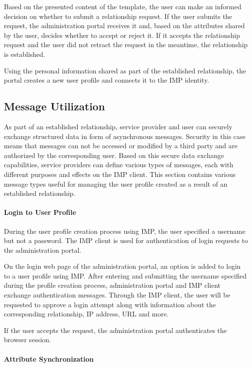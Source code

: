 Based on the presented content of the template, the user can make an informed decision on whether to submit a relationship request. If the user submits the request, the administration portal receives it and, based on the attributes shared by the user, decides whether to accept or reject it. If it accepts the relationship request and the user did not retract the request in the meantime, the relationship is established.

Using the personal information shared as part of the established relationship, the portal creates a new user profile and connects it to the IMP identity.

\subsection{Message Utilization}
As part of an established relationship, service provider and user can securely exchange structured data in form of asynchronous messages. Security in this case means that messages can not be accessed or modified by a third party and are authorized by the corresponding user. Based on this secure data exchange capabilities, service providers can define various types of messages, each with different purposes and effects on the IMP client. This section contains various message types useful for managing the user profile created as a result of an established relationship.

\paragraph{Login to User Profile}
During the user profile creation process using IMP, the user specified a username but not a password. The IMP client is used for authentication of login requests to the administration portal.

On the login web page of the administration portal, an option is added to login to a user profile using IMP. After entering and submitting the username specified during the profile creation process, administration portal and IMP client exchange authentication messages. Through the IMP client, the user will be requested to approve a login attempt along with information about the corresponding relationship, IP address, URL and more.

If the user accepts the request, the administration portal authenticates the browser session.

\paragraph{Attribute Synchronization}

